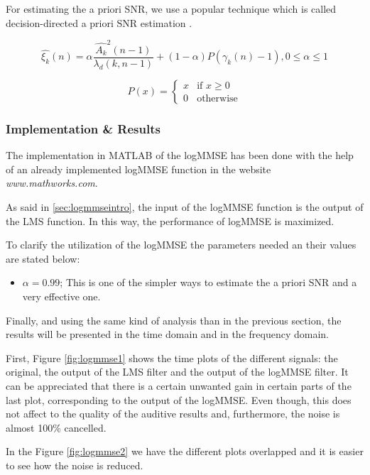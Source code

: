 \documentclass[11pt,a4paper,english]{book}  %
\theoremstyle{definition}  %
\theoremstyle{plain}  %
\theoremstyle{remark}  %
\begin{document}
	
	For estimating the a priori SNR, we use a popular technique which is called decision-directed a priori SNR estimation \cite{speech}.
	
		\begin{equation}
		\hat{\xi_{k}}(n)= \alpha \frac{\hat{A_{k}}^2 (n-1)}{\lambda_{d} (k,n-1)} + (1-\alpha) P(\gamma_{k}(n)-1), 0 \leq \alpha \leq 1
	\end{equation}
	
	
	\[
 P(x) =
  \begin{cases}
   x & \text{if } x \geq 0 \\
   0       & \text{otherwise}
  \end{cases}
\]
	
	
	\subsubsection{Implementation \& Results}

The implementation in MATLAB of the logMMSE has been done with the help of an already implemented logMMSE function in the website \textit{www.mathworks.com}.

As said in \ref{sec:logmmseintro}, the input of the logMMSE function is the output of the LMS function. In this way, the performance of logMMSE is maximized.

To clarify the utilization of the logMMSE the parameters needed an their values are stated below:

\begin{itemize}
\item $\alpha=0.99$; This is one of the simpler ways to estimate the a priori SNR and a very effective one.
\end{itemize}

Finally, and using the same kind of analysis than in the previous section, the results will be presented in the time domain and in the frequency domain.

First, Figure \ref{fig:logmmse1} shows the time plots of the different signals: the original, the output of the LMS filter and the output of the logMMSE filter. It can be appreciated that there is a certain unwanted gain in certain parts of the last plot, corresponding to the output of the logMMSE. Even though, this does not affect to the quality of the auditive results and, furthermore, the noise is almost 100\% cancelled.

In the Figure \ref{fig:logmmse2} we have the different plots overlapped and it is easier to see how the noise is reduced.
\end{document}
